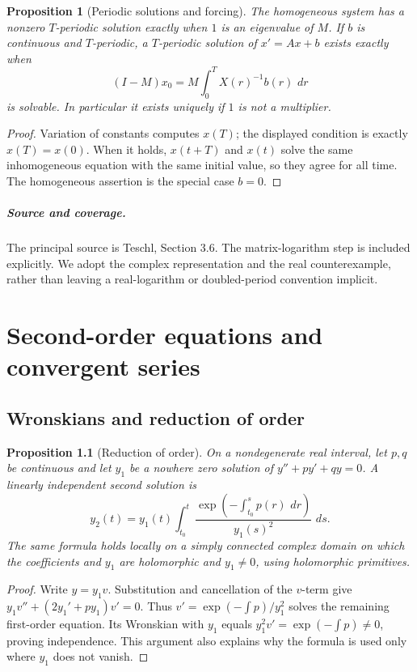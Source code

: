 \documentclass[11pt,oneside]{book}
\newtheorem{proposition}[theorem]{Proposition}
\theoremstyle{definition}
\theoremstyle{remark}\newtheorem{remark}[theorem]{Remark}
\newcommand{\dd}{\,d}\newcommand{\id}{\operatorname{id}}
\begin{document}
\begin{proposition}[Periodic solutions and forcing]\label{d13:08:periodic-forcing}
The homogeneous system has a nonzero \(T\)-periodic solution exactly when
\(1\) is an eigenvalue of \(M\). If \(b\) is continuous and \(T\)-periodic,
a \(T\)-periodic solution of \(x'=Ax+b\) exists exactly when
\[
 (I-M)x_0=M\int_0^T X(r)^{-1}b(r)\,\dd r
\]
is solvable. In particular it exists uniquely if \(1\) is not a multiplier.
\end{proposition}
\begin{proof}
Variation of constants computes \(x(T)\); the displayed condition is
exactly \(x(T)=x(0)\). When it holds, \(x(t+T)\) and \(x(t)\) solve the same
inhomogeneous equation with the same initial value, so they agree for all
time. The homogeneous assertion is the special case \(b=0\).
\end{proof}

\paragraph{Source and coverage.}
The principal source is Teschl, Section 3.6. The matrix-logarithm step is
included explicitly. We adopt the complex representation and the real
counterexample, rather than leaving a real-logarithm or doubled-period
convention implicit.



\chapter{Second-order equations and convergent series}\label{ch:d13-09}

\section{Wronskians and reduction of order}

\begin{proposition}[Reduction of order]\label{d13:09:reduction}
On a nondegenerate real interval, let \(p,q\) be continuous and let \(y_1\) be a nowhere
zero solution of \(y''+py'+qy=0\). A linearly independent second solution is
\[
 y_2(t)=y_1(t)\int_{t_0}^t
          \frac{\exp(-\int_{t_0}^s p(r)\,\dd r)}{y_1(s)^2}\,\dd s .
\]
The same formula holds locally on a simply connected complex domain on
which the coefficients and \(y_1\) are holomorphic and \(y_1\ne0\),
using holomorphic primitives.
\end{proposition}
\begin{proof}
Write \(y=y_1v\). Substitution and cancellation of the \(v\)-term give
\(y_1v''+(2y_1'+py_1)v'=0\). Thus
\(v'=\exp(-\int p)/y_1^2\) solves the remaining first-order equation.
Its Wronskian with \(y_1\) equals
\(y_1^2v'=\exp(-\int p)\ne0\), proving independence.
This argument also explains why the formula is used only where \(y_1\)
does not vanish.
\end{proof}
\end{document}
